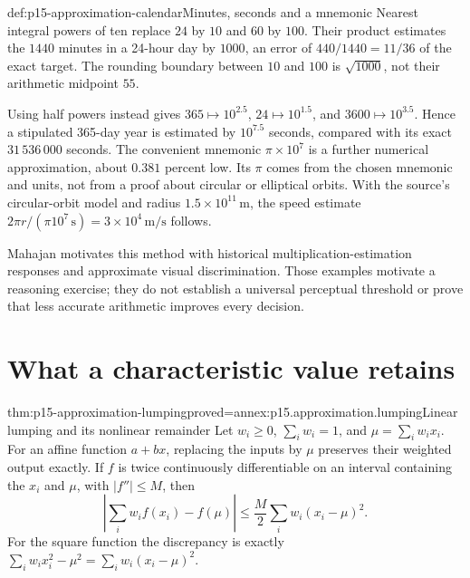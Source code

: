 \begin{hbexample}{def:p15-approximation-calendar}{Minutes, seconds and a mnemonic}
Nearest integral powers of ten replace \(24\) by \(10\) and \(60\) by
\(100\). Their product estimates the \(1440\) minutes in a 24-hour day by
\(1000\), an error of \(440/1440=11/36\) of the exact target.
The rounding boundary between \(10\) and \(100\) is \(\sqrt{1000}\), not
their arithmetic midpoint \(55\).

Using half powers instead gives
\(365\mapsto10^{2.5}\), \(24\mapsto10^{1.5}\), and
\(3600\mapsto10^{3.5}\). Hence a stipulated 365-day year is estimated by
\(10^{7.5}\) seconds, compared with its exact \(31\,536\,000\) seconds.
The convenient mnemonic \(\pi\times10^7\) is a further numerical
approximation, about \(0.381\) percent low. Its \(\pi\) comes from the
chosen mnemonic and units, not from a proof about circular or elliptical
orbits. With the source's circular-orbit model and radius
\(1.5\times10^{11}\,\mathrm m\), the speed estimate
\(2\pi r/(\pi10^7\,\mathrm s)=3\times10^4\,\mathrm{m/s}\) follows.
\end{hbexample}

Mahajan motivates this method with historical multiplication-estimation
responses and approximate visual discrimination. Those examples motivate
a reasoning exercise; they do not establish a universal perceptual threshold
or prove that less accurate arithmetic improves every decision.

\section{What a characteristic value retains}

\begin{hbtheorem}{thm:p15-approximation-lumping}{proved=annex:p15.approximation.lumping}{Linear lumping and its nonlinear remainder}
Let \(w_i\geq0\), \(\sum_iw_i=1\), and \(\mu=\sum_iw_ix_i\).
For an affine function \(a+bx\), replacing the inputs by \(\mu\) preserves
their weighted output exactly. If \(f\) is twice continuously differentiable
on an interval containing the \(x_i\) and \(\mu\), with \(|f''|\leq M\),
then
\[
 \left|\sum_iw_if(x_i)-f(\mu)\right|
 \leq\frac M2\sum_iw_i(x_i-\mu)^2.
\]
For the square function the discrepancy is exactly
\(\sum_iw_ix_i^2-\mu^2=\sum_iw_i(x_i-\mu)^2\).
\end{hbtheorem}

